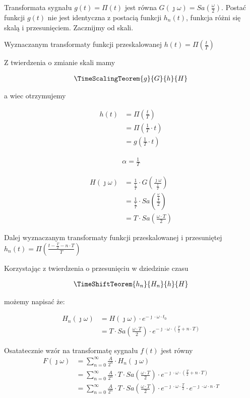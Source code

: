 \begin{task}
Transformata sygnału $g(t) = \Pi(t)$ jest równa $G(\jmath \omega)=Sa(\frac{\omega}{2})$. Postać funkcji $g(t)$ nie jest identyczna z postacią funkcji $h_n(t)$, funkcja różni się skalą i przesunięciem. Zacznijmy od skali. 

Wyznaczanym transformaty funkcji przeskalowanej $h(t)=\Pi\left(\frac{t}{T}\right)$

Z twierdzenia o zmianie skali mamy 

\begin{align*}
\TimeScalingTeorem{g}{G}{h}{H}
\end{align*}

a wiec otrzymujemy

\begin{align*}
h(t) &= \Pi\left(\frac{t}{T}\right)\\
&=\Pi\left(\frac{1}{T}\cdot t\right)\\
&=g\left(\frac{1}{T}\cdot t\right)
\end{align*}

\begin{align*}
\alpha=\frac{1}{T}
\end{align*}

\begin{align*}
H(\jmath \omega)&=\frac{1}{\frac{1}{T}} \cdot G\left(\frac{\jmath \omega}{\frac{1}{T}}\right)\\
&=\frac{1}{\frac{1}{T}} \cdot Sa\left(\frac{\frac{\omega}{\frac{1}{T}}}{2}\right)\\
&=T \cdot Sa\left(\frac{\omega \cdot T}{2}\right)
\end{align*}

Dalej wyznaczanym transformaty funkcji przeskalowanej i przesuniętej $h_n(t)=\Pi\left(\frac{t - \frac{T}{2} -n\cdot T }{T}\right)$

Korzystając z twierdzenia o przesunięciu w dziedzinie czasu 

\begin{align*}
\TimeShiftTeorem{h_n}{H_n}{h}{H}
\end{align*}

możemy napisać że:

\begin{align*}
H_n(\jmath\omega) &= H(\jmath\omega) \cdot e^{-\jmath \cdot \omega \cdot t_0}\\
&=T \cdot Sa\left(\frac{\omega \cdot T}{2}\right) \cdot e^{-\jmath \cdot \omega \cdot \left(\frac{T}{2} + n\cdot T\right)}
\end{align*}

Osatatecznie wzór na transformatę sygnału $f(t)$ jest równy 
\begin{align*}
F(\jmath\omega) &= \sum_{n=0}^{\infty}  \frac{A}{2^{n}}\cdot H_{n}(\jmath\omega)\\
&=\sum_{n=0}^{\infty}  \frac{A}{2^{n}}\cdot T \cdot Sa\left(\frac{\omega \cdot T}{2}\right) \cdot e^{-\jmath \cdot \omega \cdot \left(\frac{T}{2} + n\cdot T\right)}\\
&=\sum_{n=0}^{\infty}  \frac{A}{2^{n}}\cdot T \cdot Sa\left(\frac{\omega \cdot T}{2}\right) \cdot e^{-\jmath \cdot \omega \cdot \frac{T}{2}} \cdot e^{-\jmath \cdot \omega \cdot n\cdot T}
\end{align*}

\end{task}


